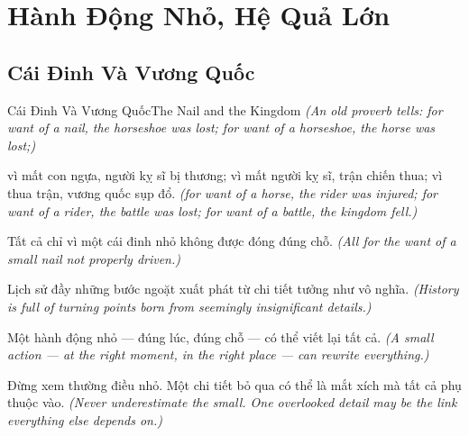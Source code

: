\chapter{Hành Động Nhỏ, Hệ Quả Lớn}

\section{Cái Đinh Và Vương Quốc}
\begin{truyen}{Cái Đinh Và Vương Quốc}{The Nail and the Kingdom}
\textit{(An old proverb tells: for want of a nail, the horseshoe was lost; for want of a horseshoe, the horse was lost;)}

vì mất con ngựa, người kỵ sĩ bị thương; vì mất người kỵ sĩ, trận chiến thua; vì thua trận, vương quốc sụp đổ.
\textit{(for want of a horse, the rider was injured; for want of a rider, the battle was lost; for want of a battle, the kingdom fell.)}

Tất cả chỉ vì một cái đinh nhỏ không được đóng đúng chỗ.
\textit{(All for the want of a small nail not properly driven.)}

Lịch sử đầy những bước ngoặt xuất phát từ chi tiết tưởng như vô nghĩa.
\textit{(History is full of turning points born from seemingly insignificant details.)}

Một hành động nhỏ — đúng lúc, đúng chỗ — có thể viết lại tất cả.
\textit{(A small action — at the right moment, in the right place — can rewrite everything.)}

\end{truyen}

\begin{baihoc}
Đừng xem thường điều nhỏ. Một chi tiết bỏ qua có thể là mắt xích mà tất cả phụ thuộc vào.
\textit{(Never underestimate the small. One overlooked detail may be the link everything else depends on.)}
\end{baihoc}
\ngancach

